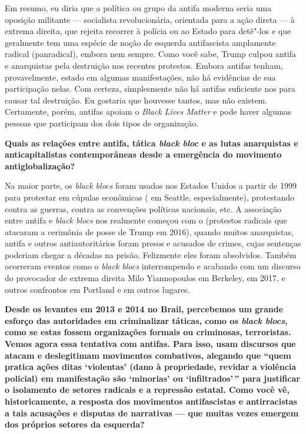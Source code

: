 Em resumo, eu diria que a política ou grupo da antifa moderna seria uma oposição militante --- socialista revolucionária, orientada para a ação direta --- à extrema direita, que rejeita recorrer à polícia ou ao Estado para detê"-los e que geralmente tem uma espécie de noção de esquerda antifascista amplamente radical (panradical), embora nem sempre. Como você sabe, Trump culpou antifa e anarquistas pela destruição nos recentes protestos. Embora antifas tenham, provavelmente, estado em algumas manifestações, não há evidências de sua participação nelas. Com certeza, simplesmente não há antifas suficiente nos  para causar tal destruição. Eu gostaria que houvesse tantos, mas não existem. Certamente, porém, antifas apoiam o \emph{Black Lives Matter} e pode haver algumas pessoas que participam dos dois tipos de organização. 

\bigskip
 
\noindent{}\textbf{Quais as relações entre antifa, tática \emph{black bloc} e as lutas anarquistas e anticapitalistas contemporâneas desde a emergência do movimento antiglobalização?}
 
Na maior parte, os \emph{black blocs} foram usados nos Estados Unidos a partir de 1999 para protestar em cúpulas econômicas ( em Seattle, especialmente), protestando contra as guerras, contra as convenções políticas nacionais, etc. A associação entre antifa e \emph{black blocs} nos  realmente começou com o  (protestos radicais que atacaram a cerimônia de posse de Trump em 2016), quando muitos anarquistas, antifa e outros antiautoritários foram presos e acusados de crimes, cujas sentenças poderiam chegar a décadas na prisão. Felizmente eles foram absolvidos. Também ocorreram eventos como o \emph{black blocs} interrompendo e acabando com um discurso do provocador de extrema direita Milo Yiannopoulos em Berkeley, em 2017, e outros confrontos em Portland e em outros lugares. 

\bigskip

\noindent{}\textbf{Desde os levantes em 2013 e 2014 no Brail, percebemos um grande esforço das autoridades em criminalizar táticas, como os \emph{black blocs}, como se estas fossem organizações formais ou criminosas, terroristas. Vemos agora essa tentativa com antifas. Para isso, usam discursos que atacam e deslegitimam movimentos combativos, alegando que ``quem pratica ações ditas `violentas' (dano à propriedade, revidar a violência policial) em manifestação são `minorias' ou `infiltrados'\,'' para justificar o isolamento de setores radicais e a repressão estatal. Como você vê, historicamente, a resposta dos movimentos antifascistas e antirracistas a tais acusações e disputas de narrativas --- que muitas vezes emergem dos próprios setores da esquerda?}
 
